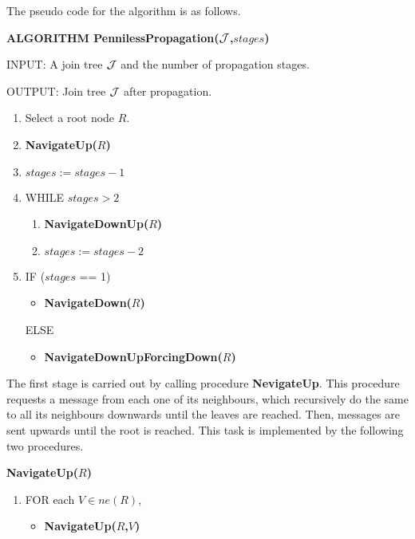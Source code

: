 The pseudo code for the algorithm is as follows.


\bigskip\noindent
\textsf{\textbf{ALGORITHM PennilessPropagation($\cal
    J$,$stages$)}}

\bigskip\noindent
INPUT: A join tree $\cal J$ and the number of propagation stages.

\noindent
OUTPUT: Join tree $\cal J$ after propagation.

\begin{enumerate}
\item Select a root node $R$.
\item \textsf{\textbf{NavigateUp($R$)}}
\item $stages := stages - 1$
\item WHILE $stages > 2$
  
  \begin{enumerate}
  \item[] \textsf{\textbf{NavigateDownUp($R$)}}
  \item[] $stages := stages - 2$
  \end{enumerate}
  
\item IF ($stages$ == 1)
  
  \begin{itemize}
  \item[] \textsf{\textbf{NavigateDown($R$)}}
  \end{itemize}
  
  ELSE
  
  \begin{itemize}
  \item[] \textsf{\textbf{NavigateDownUpForcingDown($R$)}}
  \end{itemize}
  
\end{enumerate}

The first stage is carried out by calling procedure {\bf NevigateUp}.
This procedure requests a message from each one of its
neighbours, which recursively do the same to all its neighbours downwards
until the leaves are reached. Then, messages are sent upwards
until the root is reached. This task is implemented by the following two
procedures.

\bigskip\noindent
\textsf{\textbf{NavigateUp($R$)}}

\begin{enumerate}
\item FOR each $V\in ne(R)$,
  \begin{itemize}
  \item[] \textsf{\textbf{NavigateUp($R$,$V$)}}
  \end{itemize}
\end{enumerate}


